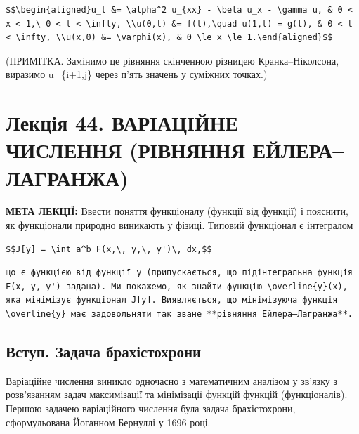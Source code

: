 \documentclass[
  ukrainian,
]{article}
\begin{document}
\begin{verbatim}
$$\begin{aligned}u_t &= \alpha^2 u_{xx} - \beta u_x - \gamma u, & 0 < x < 1,\ 0 < t < \infty, \\u(0,t) &= f(t),\quad u(1,t) = g(t), & 0 < t < \infty, \\u(x,0) &= \varphi(x), & 0 \le x \le 1.\end{aligned}$$
\end{verbatim}

(ПРИМІТКА. Замінимо це рівняння скінченною різницею Кранка--Ніколсона,
виразимо u\_\{i+1,j\} через п'ять значень у суміжних точках.)

\section{Лекція 44. ВАРІАЦІЙНЕ ЧИСЛЕННЯ (РІВНЯННЯ
ЕЙЛЕРА--ЛАГРАНЖА)}\label{ux43bux435ux43aux446ux456ux44f-44.-ux432ux430ux440ux456ux430ux446ux456ux439ux43dux435-ux447ux438ux441ux43bux435ux43dux43dux44f-ux440ux456ux432ux43dux44fux43dux43dux44f-ux435ux439ux43bux435ux440ux430ux43bux430ux433ux440ux430ux43dux436ux430}

\textbf{МЕТА ЛЕКЦІЇ:} Ввести поняття функціоналу (функції від функції) і
пояснити, як функціонали природно виникають у фізиці. Типовий функціонал
є інтегралом

\begin{verbatim}
$$J[y] = \int_a^b F(x,\, y,\, y')\, dx,$$
\end{verbatim}

\begin{verbatim}
що є функцією від функції y (припускається, що підінтегральна функція F(x, y, y') задана). Ми покажемо, як знайти функцію \overline{y}(x), яка мінімізує функціонал J[y]. Виявляється, що мінімізуюча функція \overline{y} має задовольняти так зване **рівняння Ейлера–Лагранжа**.
\end{verbatim}

\subsection{Вступ. Задача
брахістохрони}\label{ux432ux441ux442ux443ux43f.-ux437ux430ux434ux430ux447ux430-ux431ux440ux430ux445ux456ux441ux442ux43eux445ux440ux43eux43dux438}

Варіаційне числення виникло одночасно з математичним аналізом у зв'язку
з розв'язанням задач максимізації та мінімізації функцій функцій
(функціоналів). Першою задачею варіаційного числення була задача
брахістохрони, сформульована Йоганном Бернуллі у 1696 році.
\end{document}
